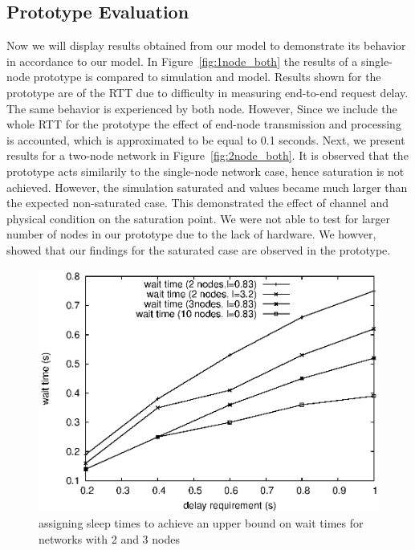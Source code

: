 \subsection{Prototype Evaluation}
Now we will display results obtained from our model to demonstrate its behavior in accordance to our model. In Figure~\ref{fig:1node_both} the results of a single-node prototype is compared to simulation and model. Results shown for the prototype are of the RTT due to difficulty in measuring end-to-end request delay. The same behavior is experienced by both node. However, Since we include the whole RTT for the prototype the effect of end-node transmission and processing is accounted, which is approximated to be equal to 0.1 seconds. Next, we present results for a two-node network in Figure~\ref{fig:2node_both}. It is observed that the prototype acts similarily to the single-node network case, hence saturation is not achieved. However, the simulation saturated and values became much larger than the expected non-saturated case. This demonstrated the effect of channel and physical condition on the saturation point. We were not able to test for larger number of nodes in our prototype due to the lack of hardware. We howver, showed that our findings for the saturated case are observed in the prototype.

\begin{figure}[t]
\centering
\includegraphics[scale=0.65]{figures/test_2nodes.eps}
\caption{assigning sleep times to achieve an upper bound on wait times for networks with 2 and 3 nodes}
\label{fig:test_2nodes}
\end{figure}

